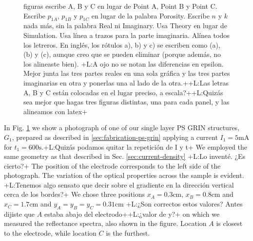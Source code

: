 \documentclass{article}
\newcommand{\notaL}[1]{{\color{blue}+L:#1+}}
\begin{document}
\begin{figure}
{{      figuras escribe A, B y C en lugar de
      Point A, Point B y Point C. Escribe $p_{1A}$, $p_{1B}$ y $p_{1C}$ en lugar
      de la palabra Porosity. Escribe $n$ y $k$ nada más, sin la
      palabra Real ni Imaginary. Usa Theory en lugar de
      Simulation. Usa línea a trazos para la parte
      imaginaria. Alínea todos los letreros. En inglés, los rótulos
      a), b) y c) se escriben como (a), (b) y (c), aunque creo que se
      pueden eliminar (porque además, no los alineaste bien). }
  \notaL{A ojo no se notan las diferencias en epsilon. Mejor junta las
  tres partes reales en una sola gráfica y las tres partes imaginarias
en otra y ponerlas una al lado de la otra.}\notaL{Las letras A, B y C
están colocadas en el lugar preciso, a escala?}\notaL{Quizás sea mejor
que hagas tres figuras distintas, una para cada panel, y las alineamos
con latex}}
  \label{fig:DR3}
\end{figure}
 In Fig. \ref{fig:DR3} we show a photograph of one of our single layer PS GRIN
 structures, $G_1$, prepared as described in
 \ref{sec:fabrication-ps-grin} applying a current $I_1=5\text{mA}$ for
 $t_1=600\text{s}$.\notaL{Quizás podamos quitar la repetición de I y
   t} We employed the same geometry as that described in
 Sec. \ref{sec:current-density} \notaL{Lo inventé. ¿Es cierto?}
The position of the electrode corresponds to the left side of the
photograph. The variation of the optical properties across the
sample is evident. \notaL{Tenemos algo sensato que decir sobre el
  gradiente en la dirección vertical cerca de los bordes?}
We chose three positions $x_A=0.3\text{cm}$,
$x_B=0.8\text{cm}$ and $x_C=1.7\text{cm}$ and
$y_A=y_B=y_C=0.31\text{cm}$  \notaL{¿Son correctos estos
  valores? Antes dijiste que $A$ estaba abajo del electrodo}\notaL{¿valor de y?} on
which we measured the reflectance spectra, also shown in the figure. Location $A$ is
closest to the electrode, while location $C$ is the furthest.
\end{document}
